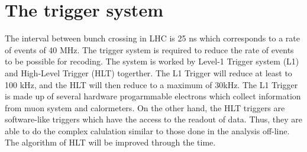 \section{The trigger system}
The interval between bunch crossing in LHC is 25 ns which corresponds to a rate of events of 40 MHz.
The trigger system is required to reduce the rate of events to be possible for recoding.
The system is worked by Level-1 Trigger system (L1) and High-Level Trigger (HLT) togerther.
The L1 Trigger will reduce at least to 100 kHz, and the HLT will then reduce to a maximum of 30kHz.
The L1 Trigger is made up of several hardware progarmmable electrons which collect information from muon system and calormeters.
On the other hand, the HLT triggers are software-like triggers which have the access to the readout of data. 
Thus, they are able to do the complex calulation similar to those done in the analysis off-line. 
The algorithm of HLT will be improved through the time.
 